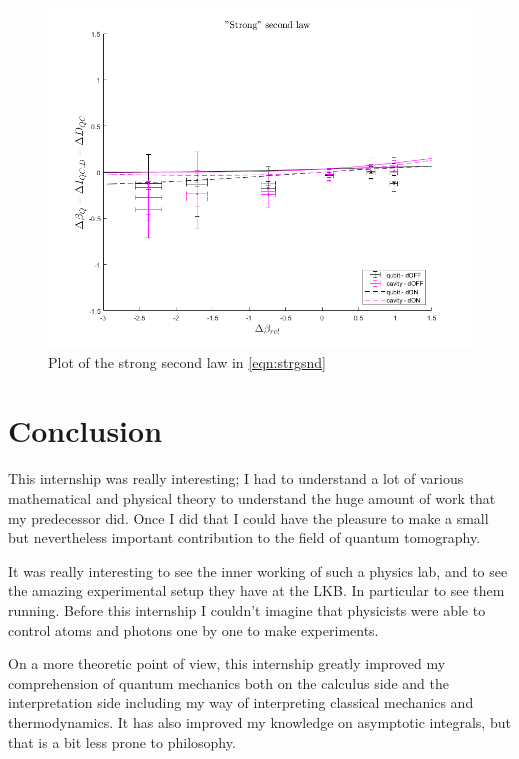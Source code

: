 \documentclass[10pt,a4paper]{report}
\theoremstyle{plain}
\theoremstyle{definition}
\theoremstyle{remark}
\begin{document}
\begin{figure}
  \centering
  \includegraphics[height=0.45\textheight]{plots/Strg2.png}
  \caption{Plot of the strong second law in \cref{eqn:strgsnd}}\label{fig:strg2}
\end{figure}


\chapter*{Conclusion} %

This internship was really interesting; I had to understand a lot of various
mathematical and physical theory to understand the huge amount of work that my
predecessor did. Once I did that I could have the pleasure to make a small but
nevertheless important
contribution to the field of quantum tomography.

It was really interesting to see the inner working of such a physics lab, and
to see the amazing experimental setup they have at the LKB. In particular to see
them running. Before
this internship I couldn't imagine that physicists were able to control atoms
and photons one by one to make experiments.

On a more theoretic point of view, this internship greatly improved my
comprehension of quantum mechanics both on the calculus side and the
interpretation side including my way of interpreting classical mechanics and
thermodynamics. It has also improved my knowledge on asymptotic integrals, but
that is a bit less prone to philosophy.
\end{document}
